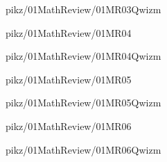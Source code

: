 \documentclass[9pt,xcolor={svgnames, x11names}]{beamer}
\begin{document}

\begin{frame}{pikz/01MathReview/01MR03Qwizm}
	
\end{frame}


\begin{frame}{pikz/01MathReview/01MR04}
	\resizebox{0.5\textwidth}{!}{%
		
	}
\end{frame}


\begin{frame}{pikz/01MathReview/01MR04Qwizm}
	
\end{frame}


\begin{frame}{pikz/01MathReview/01MR05}
	
\end{frame}


\begin{frame}{pikz/01MathReview/01MR05Qwizm}
	
\end{frame}


\begin{frame}{pikz/01MathReview/01MR06}
	
\end{frame}


\begin{frame}{pikz/01MathReview/01MR06Qwizm}
	
\end{frame}


\end{document}
